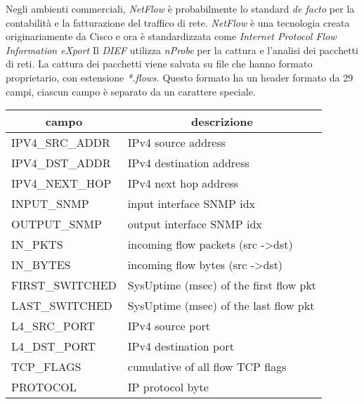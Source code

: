 \documentclass[../main.tex]{subfiles}
\begin{document}
Negli ambienti commerciali, \textit{NetFlow} è probabilmente lo standard \textit{de facto} per la contabilità e la fatturazione del traffico di rete. \textit{NetFlow} è una tecnologia creata originariamente da Cisco e ora è standardizzata come \textit{Internet Protocol Flow Information eXport} \newline
Il \textit{DIEF} utilizza \textit{nProbe} per la cattura e l'analisi dei pacchetti di reti. La cattura dei pacchetti viene salvata su file che hanno formato proprietario, con estensione \textit{*.flows}.
Questo formato ha un header formato da 29 campi, ciascun campo è separato da un carattere speciale.

\begin{table}[H]
\begin{tabular}{|l|l|}
\hline
\multicolumn{1}{|c|}{\textbf{campo}} & \multicolumn{1}{c|}{\textbf{descrizione}}     \\ \hline
IPV4\_SRC\_ADDR                      & IPv4 source address                           \\ \hline
IPV4\_DST\_ADDR                      & IPv4 destination address                      \\ \hline
IPV4\_NEXT\_HOP                      & IPv4 next hop address                         \\ \hline
INPUT\_SNMP                          & input interface SNMP idx                      \\ \hline
OUTPUT\_SNMP                         & output interface SNMP idx                     \\ \hline
IN\_PKTS                             & incoming flow packets (src -\textgreater dst) \\ \hline
IN\_BYTES                            & incoming flow bytes (src -\textgreater dst)   \\ \hline
FIRST\_SWITCHED                      & SysUptime (msec) of the first flow pkt        \\ \hline
LAST\_SWITCHED                       & SysUptime (msec) of the last flow pkt         \\ \hline
L4\_SRC\_PORT                        & IPv4 source port                              \\ \hline
L4\_DST\_PORT                        & IPv4 destination port                         \\ \hline
TCP\_FLAGS                           & cumulative of all flow TCP flags              \\ \hline
PROTOCOL                             & IP protocol byte                              \\ \hline

\end{tabular}
\end{table}
\end{document}
